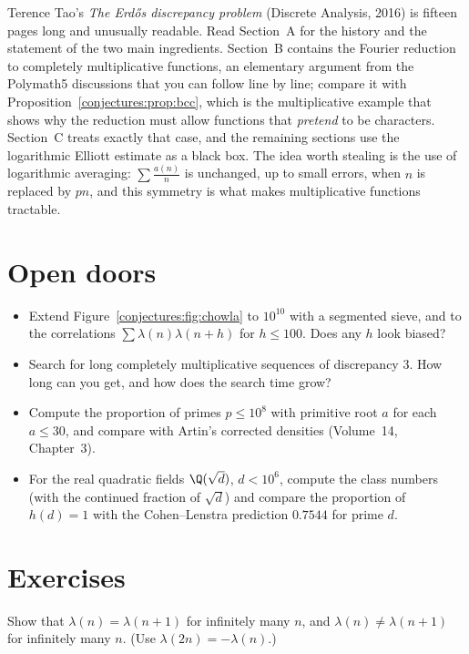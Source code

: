 Terence Tao's \emph{The Erd\H os discrepancy problem} (Discrete Analysis, 2016) is fifteen pages long and unusually readable. Read Section~A for the history and
the statement of the two main ingredients. Section~B contains the Fourier reduction to completely multiplicative functions, an elementary argument from the
Polymath5 discussions that you can follow line by line; compare it with Proposition~\ref{conjectures:prop:bcc}, which is the multiplicative example that shows why the
reduction must allow functions that \emph{pretend} to be characters. Section~C treats exactly that case, and the remaining sections use the logarithmic
Elliott estimate as a black box. The idea worth stealing is the use of logarithmic averaging: $\sum\frac{a(n)}n$ is unchanged, up to small errors, when $n$ is
replaced by $pn$, and this symmetry is what makes multiplicative functions tractable.

\section{Open doors}

\begin{itemize}
\item Extend Figure~\ref{conjectures:fig:chowla} to $10^{10}$ with a segmented sieve, and to the correlations $\sum\lambda(n)\lambda(n+h)$ for $h\le100$. Does any $h$
look biased?
\item Search for long completely multiplicative sequences of discrepancy $3$. How long can you get, and how does the search time grow?
\item Compute the proportion of primes $p\le10^8$ with primitive root $a$ for each $a\le30$, and compare with Artin's corrected densities (Volume~14, Chapter~3).
\item For the real quadratic fields $\Q(\sqrt d)$, $d<10^6$, compute the class numbers (with the continued fraction of $\sqrt d$) and compare the proportion
of $h(d)=1$ with the Cohen--Lenstra prediction $0.7544$ for prime $d$.
\end{itemize}

\section{Exercises}

\begin{exercise}[$\star$]\label{conjectures:ex:signflip}
Show that $\lambda(n)=\lambda(n+1)$ for infinitely many $n$, and $\lambda(n)\ne\lambda(n+1)$ for infinitely many $n$. (Use $\lambda(2n)=-\lambda(n)$.)
\end{exercise}

